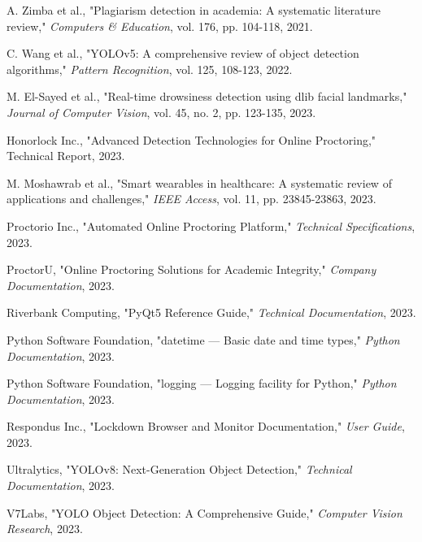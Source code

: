 \documentclass[conference]{IEEEtran}
\begin{document}
\begin{thebibliography}{99}
A. Zimba et al., "Plagiarism detection in academia: A systematic literature review," \textit{Computers \& Education}, vol. 176, pp. 104-118, 2021.

C. Wang et al., "YOLOv5: A comprehensive review of object detection algorithms," \textit{Pattern Recognition}, vol. 125, 108-123, 2022.

M. El-Sayed et al., "Real-time drowsiness detection using dlib facial landmarks," \textit{Journal of Computer Vision}, vol. 45, no. 2, pp. 123-135, 2023.

Honorlock Inc., "Advanced Detection Technologies for Online Proctoring," Technical Report, 2023.

M. Moshawrab et al., "Smart wearables in healthcare: A systematic review of applications and challenges," \textit{IEEE Access}, vol. 11, pp. 23845-23863, 2023.

Proctorio Inc., "Automated Online Proctoring Platform," \textit{Technical Specifications}, 2023.

ProctorU, "Online Proctoring Solutions for Academic Integrity," \textit{Company Documentation}, 2023.

Riverbank Computing, "PyQt5 Reference Guide," \textit{Technical Documentation}, 2023.

Python Software Foundation, "datetime — Basic date and time types," \textit{Python Documentation}, 2023.

Python Software Foundation, "logging — Logging facility for Python," \textit{Python Documentation}, 2023.

Respondus Inc., "Lockdown Browser and Monitor Documentation," \textit{User Guide}, 2023.

Ultralytics, "YOLOv8: Next-Generation Object Detection," \textit{Technical Documentation}, 2023.

V7Labs, "YOLO Object Detection: A Comprehensive Guide," \textit{Computer Vision Research}, 2023.

\end{thebibliography}
\end{document}
